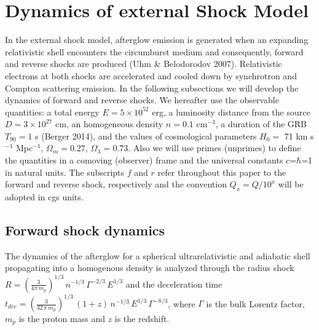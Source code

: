 \documentclass[11pt,twoside]{article}
\begin{document}
\section{Dynamics of external Shock Model} 
%
In the external shock model, afterglow emission is generated when an expanding relativistic shell encounters the circumburst medium and consequently,  forward and reverse shocks are produced (Uhm \& Belodorodov 2007).  Relativistic  electrons at both shocks are accelerated and cooled down by synchrotron and Compton scattering emission. In the following subsections we will develop the dynamics of forward and reverse shocks.  We hereafter use the observable quantities: a total energy $E=5\times10^{52}$ erg,  a luminosity distance from the source  $D=3\times 10^{27}$ cm, an homogeneous density $n=0.1$ cm$^{-3}$, a duration of the GRB $T_{90}=1$ s (Berger 2014), and the values of cosmological parameters $H_0=$ 71 km s$^{-1}$ Mpc$^{-1}$, $\Omega_m=0.27$, $\Omega_\lambda=0.73$.  Also  we will use  primes (unprimes) to define the quantities in a comoving (observer) frame and the universal constants  $\mathit{c}$=$\hbar$=1 in natural units. The subscripts $\mathit{f}$ and $\mathit{r}$ refer throughout this paper to the forward and reverse shock, respectively and the convention $Q_x=Q/10^x$ will be adopted in cgs units.
%
%
\subsection{Forward shock dynamics}
%
The dynamics of the afterglow for a spherical ultrarelativistic and adiabatic shell propagating into a homogenous density is analyzed through the radius shock $R=\left( \frac{3}{4\pi \,m_p}\right)^{1/3} \,n^{-1/3}\,\Gamma^{-2/3} \,E^{1/3}$ and  the deceleration time $t_{dec}=\left(\frac{3}{32\,\pi\,m_p}\right)^{1/3}\,(1+z)\,n^{-1/3}\,E^{1/3}\,\Gamma^{-8/3}$, where $\Gamma$ is the bulk Lorentz factor,  $m_p$ is the proton mass and $z$ is the redshift. 
%
%
\end{document}

